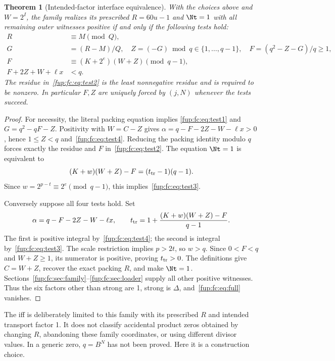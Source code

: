\documentclass[11pt,letterpaper]{article}
\newtheorem{theorem}{Theorem}[section]
\theoremstyle{definition}\newtheorem{definition}[theorem]{Definition}
\theoremstyle{remark}\newtheorem{remark}[theorem]{Remark}
\newcommand{\D}{\Delta}
\begin{document}
\begin{theorem}[Intended-factor interface equivalence]\label{fup:fc:thm:interface}
With the choices above and $W=2^I$, the family realizes its prescribed
$R=60u-1$ and $\Nt=1$ with all remaining outer witnesses positive if
and only if the following tests hold:
\begin{align}
 R&\equiv M\pmod Q,\label{fup:fc:eq:test1}\\
 G&=(R-M)/Q,\quad Z=(-G)\bmod q\in\{1,\ldots,q-1\},
 \quad F=(q^2-Z-G)/q\ge1,\label{fup:fc:eq:test2}\\
 F&\equiv(K+2^e)(W+Z)\pmod{q-1},\label{fup:fc:eq:test3}\\
 F+2Z+W+\ell x&<q.\label{fup:fc:eq:test4}
\end{align}
The residue in~\eqref{fup:fc:eq:test2} is the least nonnegative residue and
is required to be nonzero. In particular $F,Z$ are uniquely forced
by $(j,N)$ whenever the tests succeed.
\end{theorem}
\begin{proof}
For necessity, the literal packing equation implies
\eqref{fup:fc:eq:test1} and $G=q^2-qF-Z$. Positivity with $W=C-Z$ gives
$\alpha=q-F-2Z-W-\ell x>0$, hence $1\le Z<q$ and~\eqref{fup:fc:eq:test4}.
Reducing the packing identity modulo $q$ forces exactly the residue and
$F$ in~\eqref{fup:fc:eq:test2}. The equation $\Nt=1$ is equivalent to
\[
 (K+w)(W+Z)-F=(t_{\rm tr}-1)(q-1).
\]
Since $w=2^{p-t}\equiv2^e\pmod{q-1}$, this implies~\eqref{fup:fc:eq:test3}.

Conversely suppose all four tests hold. Set
\begin{equation}
 \alpha=q-F-2Z-W-\ell x,\qquad
 t_{\rm tr}=1+\frac{(K+w)(W+Z)-F}{q-1}.\label{fup:fc:eq:outer-witnesses}
\end{equation}
The first is positive integral by~\eqref{fup:fc:eq:test4}; the second is integral
by~\eqref{fup:fc:eq:test3}. The scale restriction implies $p>2t$, so $w>q$.
Since $0<F<q$ and $W+Z\ge1$, its numerator is positive, proving
$t_{\rm tr}>0$. The definitions give $C=W+Z$, recover the exact packing
$R$, and make $\Nt=1$. Sections~\ref{fup:fc:sec:family}--\ref{fup:fc:sec:loader}
supply all other positive witnesses. Thus the six factors other than
strong are 1, strong is $\D$, and~\eqref{fup:fc:eq:full} vanishes.
\end{proof}

The iff is deliberately limited to this family with its prescribed $R$
and intended transport factor 1. It does not classify accidental product
zeros obtained by changing $R$, abandoning these family coordinates, or
using different divisor values. In a generic zero, $q=B^N$ has not been
proved. Here it is a construction choice.
\end{document}
